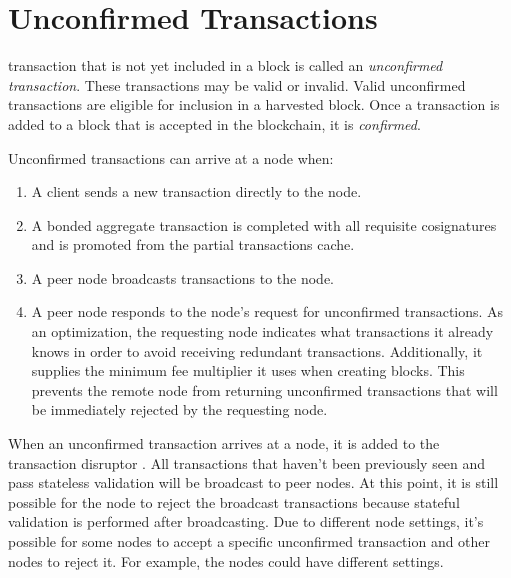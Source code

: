 \section{Unconfirmed Transactions}
\label{sec:unconfirmedTransactions}


 transaction that is not yet included in a block is called an \emph{unconfirmed transaction}.
These transactions may be valid or invalid.
Valid unconfirmed transactions are eligible for inclusion in a harvested block.
Once a transaction is added to a block that is accepted in the blockchain, it is \emph{confirmed}.

Unconfirmed transactions can arrive at a node when:
\begin{enumerate}
	\item{A client sends a new transaction directly to the node.}
	\item{A bonded aggregate transaction is completed with all requisite cosignatures and is promoted from the partial transactions cache.}
	\item{A peer node broadcasts transactions to the node.}
	\item{A peer node responds to the node's request for unconfirmed transactions.
	As an optimization, the requesting node indicates what transactions it already knows in order to avoid receiving redundant transactions.
	Additionally, it supplies the minimum fee multiplier  it uses when creating blocks.
	This prevents the remote node from returning unconfirmed transactions that will be immediately rejected by the requesting node.}
\end{enumerate}

When an unconfirmed transaction arrives at a node, it is added to the transaction disruptor .
All transactions that haven't been previously seen and pass stateless validation will be broadcast to peer nodes.
At this point, it is still possible for the node to reject the broadcast transactions because stateful validation is performed after broadcasting.
Due to different node settings, it's possible for some nodes to accept a specific unconfirmed transaction and other nodes to reject it.
For example, the nodes could have different  settings.

